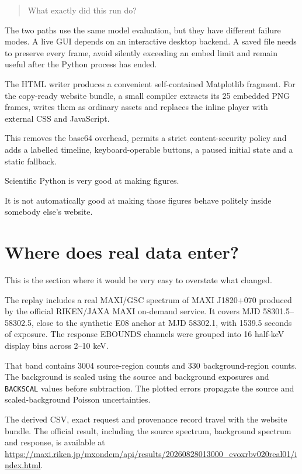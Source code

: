 \documentclass[11pt]{article}
\begin{document}
\begin{quote}
What exactly did this run do?
\end{quote}

The two paths use the same model evaluation, but they have different failure
modes. A live GUI depends on an interactive desktop backend. A saved file needs
to preserve every frame, avoid silently exceeding an embed limit and remain
useful after the Python process has ended.

The HTML writer produces a convenient self-contained Matplotlib fragment. For
the copy-ready website bundle, a small compiler extracts its 25 embedded PNG
frames, writes them as ordinary assets and replaces the inline player with
external CSS and JavaScript.

This removes the base64 overhead, permits a strict content-security policy and
adds a labelled timeline, keyboard-operable buttons, a paused initial state and
a static fallback.

Scientific Python is very good at making figures.

It is not automatically good at making those figures behave politely inside
somebody else's website.

\section{Where does real data enter?}

This is the section where it would be very easy to overstate what changed.

The replay includes a real MAXI/GSC spectrum of MAXI J1820+070 produced by the
official RIKEN/JAXA MAXI on-demand service. It covers MJD
58301.5--58302.5, close to the synthetic E08 anchor at MJD 58302.1, with
1539.5 seconds of exposure. The response EBOUNDS channels were grouped into 16
half-keV display bins across 2--10 keV.

That band contains 3004 source-region counts and 330 background-region counts.
The background is scaled using the source and background exposures and
\texttt{BACKSCAL} values before subtraction. The plotted errors propagate the
source and scaled-background Poisson uncertainties.

The derived CSV, exact request and provenance record travel with the website
bundle. The official result, including the source spectrum, background spectrum
and response, is available at
\url{https://maxi.riken.jp/mxondem/api/results/20260828013000_evoxrbv020real01/index.html}.
\end{document}
